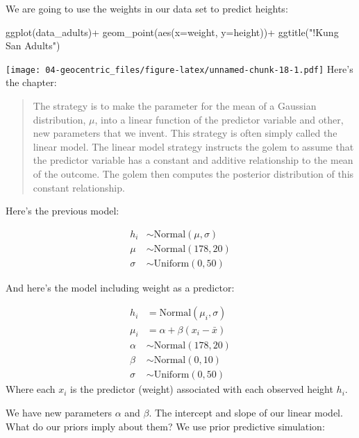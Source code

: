 \documentclass[
]{book}
\newenvironment{Shaded}{\begin{snugshade}}{\end{snugshade}}
\newcommand{\AttributeTok}[1]{\textcolor[rgb]{0.77,0.63,0.00}{#1}}
\newcommand{\FunctionTok}[1]{\textcolor[rgb]{0.00,0.00,0.00}{#1}}
\newcommand{\NormalTok}[1]{#1}
\newcommand{\SpecialCharTok}[1]{\textcolor[rgb]{0.00,0.00,0.00}{#1}}
\newcommand{\StringTok}[1]{\textcolor[rgb]{0.31,0.60,0.02}{#1}}
\begin{document}
We are going to use the weights in our data set to predict heights:

\begin{Shaded}
\begin{Highlighting}[]
\FunctionTok{ggplot}\NormalTok{(data\_adults)}\SpecialCharTok{+}
  \FunctionTok{geom\_point}\NormalTok{(}\FunctionTok{aes}\NormalTok{(}\AttributeTok{x=}\NormalTok{weight, }\AttributeTok{y=}\NormalTok{height))}\SpecialCharTok{+}
  \FunctionTok{ggtitle}\NormalTok{(}\StringTok{"!Kung San Adults"}\NormalTok{)}
\end{Highlighting}
\end{Shaded}

\texttt{[image: 04-geocentric\_files/figure-latex/unnamed-chunk-18-1.pdf]}
Here's the chapter:

\begin{quote}
The strategy is to make the parameter for the mean of a Gaussian distribution, \(\mu\), into a linear function of the predictor variable and other, new parameters that we invent. This strategy is often simply called the linear model. The linear model strategy instructs the golem to assume that the predictor variable has a constant and additive relationship to the mean of the outcome. The golem then computes the posterior distribution of this constant relationship.
\end{quote}

Here's the previous model:

\[
\begin{aligned}
h_i &\sim \text{Normal}(\mu, \sigma)\\
\mu &\sim \text{Normal}(178, 20) \\
\sigma &\sim \text{Uniform}(0,50)
\end{aligned}
\]

And here's the model including weight as a predictor:

\[
\begin{aligned}
h_i &= \text{Normal}(\mu_i, \sigma)\\
\mu_i &= \alpha + \beta(x_i - \bar{x}) \\
\alpha &\sim \text{Normal}(178, 20) \\
\beta &\sim \text{Normal}(0, 10) \\
\sigma &\sim \text{Uniform}(0,50)
\end{aligned}
\]
Where each \(x_i\) is the predictor (weight) associated with each observed height \(h_i\).

We have new parameters \(\alpha\) and \(\beta\). The intercept and slope of our linear model. What do our priors imply about them? We use prior predictive simulation:
\end{document}
